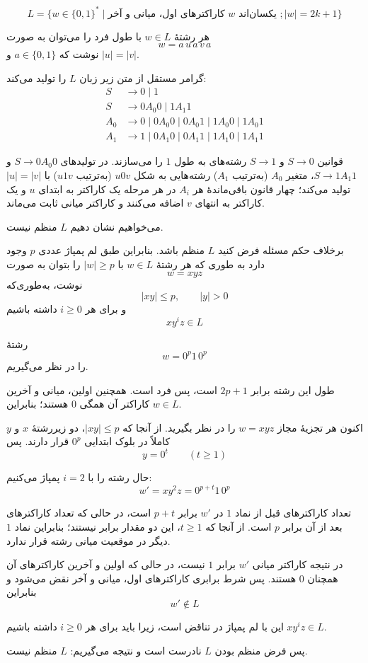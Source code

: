\[
L=\{w\in\{0,1\}^*\mid \text{کاراکترهای اول، میانی و آخر } w \text{ یکسان‌اند } ; |w|=2k+1\}
\]

هر رشتهٔ $w\in L$ با طول فرد را می‌توان به صورت
\[
w = a\,u\,a\,v\,a
\]
نوشت که $a\in\{0,1\}$ و $|u|=|v|$.


گرامر مستقل از متن زیر زبان $L$ را تولید می‌کند:
\[
\begin{aligned}
S &\to 0 \mid 1 \\
S &\to 0A_0 0 \mid 1A_1 1 \\
A_0 &\to 0 \mid 0A_0 0 \mid 0A_0 1 \mid 1A_0 0 \mid 1A_0 1 \\
A_1 &\to 1 \mid 0A_1 0 \mid 0A_1 1 \mid 1A_1 0 \mid 1A_1 1
\end{aligned}
\]

قوانین $S\to 0$ و $S\to 1$ رشته‌های به طول $1$ را می‌سازند.
در تولیدهای $S\to 0A_0 0$ و $S\to 1A_1 1$، متغیر $A_0$ (به‌ترتیب $A_1$) رشته‌هایی به شکل $u0v$ (به‌ترتیب $u1v$) با $|u|=|v|$ تولید می‌کند؛
چهار قانون باقی‌ماندهٔ هر $A_i$ در هر مرحله یک کاراکتر به ابتدای $u$ و یک کاراکتر به انتهای $v$ اضافه می‌کنند و کاراکتر میانی ثابت می‌ماند.


می‌خواهیم نشان دهیم $L$ منظم نیست.

برخلاف حکم مسئله فرض کنید $L$ منظم باشد.
بنابراین طبق لم پمپاژ عددی \(p\) وجود دارد به طوری که هر رشتهٔ
\(w\in L\) با \( |w|\ge p \)
را بتوان به صورت
\[
w=xyz
\]
نوشت، به‌طوری‌که
\[
|xy|\le p,\qquad |y|>0
\]
و برای هر \(i\ge0\) داشته باشیم
\[
xy^iz\in L
\]

رشتهٔ
\[
w=0^{p}1\,0^{p}
\]
را در نظر می‌گیریم.

طول این رشته برابر \(2p+1\) است، پس فرد است.
همچنین اولین، میانی و آخرین کاراکتر آن همگی \(0\) هستند؛
بنابراین \(w\in L\).

اکنون هر تجزیهٔ مجاز \(w=xyz\) را در نظر بگیرید.
از آنجا که \( |xy|\le p \)،
دو زیررشتهٔ \(x\) و \(y\) کاملاً در بلوک ابتدایی \(0^{p}\) قرار دارند.
پس
\[
y=0^t
\qquad (t\ge1)
\]

حال رشته را با \(i=2\) پمپاژ می‌کنیم:
\[
w' = xy^2z = 0^{p+t}1\,0^{p}
\]

تعداد کاراکترهای قبل از نماد \(1\) در \(w'\) برابر \(p+t\) است، در حالی که تعداد کاراکترهای بعد از آن برابر \(p\) است.
از آنجا که \(t\ge1\)، این دو مقدار برابر نیستند؛ بنابراین نماد \(1\) دیگر در موقعیت میانی رشته قرار ندارد.

در نتیجه کاراکتر میانی \(w'\) برابر \(1\) نیست، در حالی که اولین و آخرین کاراکترهای آن همچنان \(0\) هستند.
پس شرط برابری کاراکترهای اول، میانی و آخر نقض می‌شود و بنابراین
\[
w'\notin L
\]

این با لم پمپاژ در تناقض است، زیرا باید برای هر \(i\ge0\) داشته باشیم \(xy^iz\in L\).

پس فرض منظم بودن \(L\) نادرست است و نتیجه می‌گیریم:
\(
L
\)
منظم نیست.